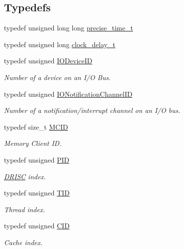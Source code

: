\subsection*{Typedefs}
\begin{DoxyCompactItemize}
\item 
typedef unsigned long long \hyperlink{namespace_simulator_acef09fa68ac870eef8d3706c5ed8f242}{precise\+\_\+time\+\_\+t}
\item 
typedef unsigned long \hyperlink{namespace_simulator_a6dba9f13bee6216957a1babe62111de8}{clock\+\_\+delay\+\_\+t}
\item 
typedef unsigned \hyperlink{namespace_simulator_a3493d987c866ad6b8aaa704c42502db0}{I\+O\+Device\+I\+D}
\begin{DoxyCompactList}\small\item\em Number of a device on an I/\+O Bus. \end{DoxyCompactList}\item 
typedef unsigned \hyperlink{namespace_simulator_a951e1bf3ee91c11c980382a7bcbba287}{I\+O\+Notification\+Channel\+I\+D}
\begin{DoxyCompactList}\small\item\em Number of a notification/interrupt channel on an I/\+O bus. \end{DoxyCompactList}\item 
typedef size\+\_\+t \hyperlink{namespace_simulator_a4b5747ff30c62c6373badf3b53b9abf7}{M\+C\+I\+D}
\begin{DoxyCompactList}\small\item\em Memory Client I\+D. \end{DoxyCompactList}\item 
typedef unsigned \hyperlink{namespace_simulator_aa671021151c047ae2da6dce4e6303476}{P\+I\+D}
\begin{DoxyCompactList}\small\item\em \hyperlink{class_simulator_1_1_d_r_i_s_c}{D\+R\+I\+S\+C} index. \end{DoxyCompactList}\item 
typedef unsigned \hyperlink{namespace_simulator_a483cc4ecee1736e895054617672cded5}{T\+I\+D}
\begin{DoxyCompactList}\small\item\em Thread index. \end{DoxyCompactList}\item 
typedef unsigned \hyperlink{namespace_simulator_a97f45fafcb1aafc0f269a19608b39d60}{C\+I\+D}
\begin{DoxyCompactList}\small\item\em Cache index. \end{DoxyCompactList}\item 

\end{DoxyCompactItemize}
